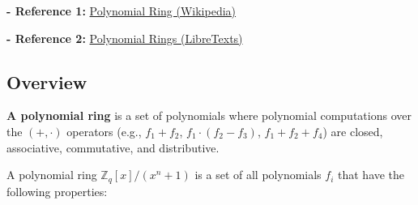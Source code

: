 \textbf{- Reference 1:} 
\href{https://en.wikipedia.org/wiki/Polynomial_ring}{Polynomial Ring (Wikipedia)}~\cite{polynomial-ring}

\noindent \textbf{- Reference 2:} 
\href{https://math.libretexts.org/Bookshelves/Combinatorics_and_Discrete_Mathematics/Applied_Discrete_Structures_(Doerr_and_Levasseur)/16%3A_An_Introduction_to_Rings_and_Fields/16.03%3A_Polynomial_Rings}{Polynomial Rings (LibreTexts)}~\cite{polynomial-rings}

\subsection{Overview}
\label{subsec:poly-ring-overview}

\textbf{A polynomial ring} is a set of polynomials where polynomial computations over the $(+, \cdot)$ operators (e.g., $f_1 + f_2$, $f_1 \cdot (f_2 - f_3)$, $f_1 + f_2 + f_4$) are closed, associative, commutative, and distributive. 


A polynomial ring ${\mathbb{Z}_q[x] / (x^n + 1)}$ is a set of all polynomials $f_i$ that have the following properties:

